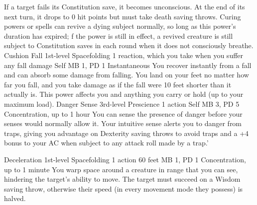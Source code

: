If a target fails its Constitution save, it becomes unconscious.
At the end of its next turn, it drops to 0 hit points but
must take death saving throws. Curing powers or spells can
revive a dying subject normally, so long as this power's
duration has expired; f the power is still in effect, a revived
creature is still subject to Constitution saves in each round
when it does not consciously breathe.
\DndPowerHeader%
    {Cushion Fall\label{pwr:cushion_fall}}
    {1st-level Spacefolding}
    {1 reaction, which you take when you suffer any fall damage}
    {Self}
    {MB 1, PD 1}
    {Instantaneous}
You recover instantly from a fall and can
absorb some damage from falling. You land on your feet no
matter how far you fall, and you take damage as if the fall
were 10 feet shorter than it actually is. This power affects
you and anything you carry or hold (up to your maximum load).
\DndPowerHeader%
    {Danger Sense\label{pwr:danger_sense}}
    {3rd-level Prescience}
    {1 action}
    {Self}
    {MB 3, PD 5}
    {Concentration, up to 1 hour}
You can sense the presence of danger before
your senses would normally allow it. Your intuitive sense
alerts you to danger from traps, giving you advantage on Dexterity
saving throws to avoid traps and a +4 bonus to your AC when
subject to any attack roll made by a trap.'

\DndPowerHeader%
    {Deceleration\label{pwr:deceleration}}
    {1st-level Spacefolding}
    {1 action}
    {60 feet}
    {MB 1, PD 1}
    {Concentration, up to 1 minute}
You warp space around a creature in range
that you can see, hindering the target's ability to move.
The target must succeed on a Wisdom saving throw, otherwise
their speed (in every movement mode they possess) is halved.

